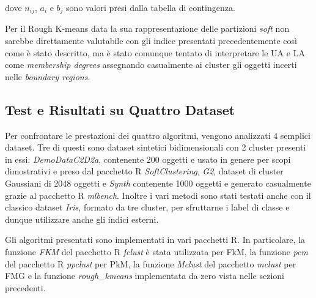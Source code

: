 \documentclass[12pt]{article}
\begin{document}
dove $n_{ij}$, $a_i$ e $b_j$ sono valori presi dalla tabella di contingenza.

Per il Rough K-means data la sua rappresentazione delle partizioni \textit{soft} non sarebbe direttamente valutabile con gli indice presentati precedentemente così come è stato descritto, ma è stato comunque tentato di interpretare le UA e LA come \textit{membership degrees} assegnando casualmente ai cluster gli oggetti incerti nelle \textit{boundary regions}.

\subsection{Test e Risultati su Quattro Dataset}

Per confrontare le prestazioni dei quattro algoritmi, vengono analizzati 4 semplici dataset. Tre di questi sono dataset sintetici bidimensionali con 2 cluster presenti in essi: \textit{DemoDataC2D2a}, contenente 200 oggetti e usato in genere per scopi dimostrativi e preso dal pacchetto R \textit{SoftClustering}, \textit{G2}, dataset di cluster Gaussiani di 2048 oggetti e \textit{Synth} contenente 1000 oggetti e generato casualmente grazie al pacchetto R \textit{mlbench}. Inoltre i vari metodi sono stati testati anche con il classico dataset \textit{Iris}, formato da tre cluster, per sfruttarne i label di classe e dunque utilizzare anche gli indici esterni.

Gli algoritmi presentati sono implementati in vari pacchetti R. In particolare, la funzione \textit{FKM} del pacchetto R \textit{fclust} è stata utilizzata per FkM, la funzione \textit{pcm} del pacchetto R \textit{ppclust} per PkM, la funzione \textit{Mclust} del pacchetto \textit{mclust} per FMG e la funzione \textit{rough\_kmeans} implementata da zero vista nelle sezioni precedenti.
\end{document}
